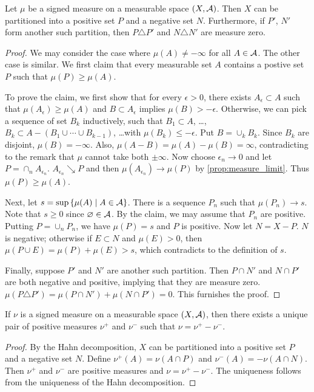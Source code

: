 \begin{theorem}
    Let $\mu$ be a signed measure on a measurable space $(X,\mathcal{A})$. Then 
    $X$ can be partitioned into a positive set $P$ and a negative set $N$. 
    Furthermore, if $P'$, $N'$ form another such partition, then 
    $P\triangle P'$ and $N\triangle N'$ are measure zero.
\end{theorem}
\begin{proof}
    We may consider the case where $\mu(A)\neq -\infty$ for all $A\in\mathcal{A}$. 
    The other case is similar. We first claim that every measurable set 
    $A$ contains a postive set $P$ such that $\mu(P)\geq\mu(A)$. 

    To prove the claim, we first show that for every $\epsilon>0$, 
    there exists $A_\epsilon\subset A$ such that $\mu(A_\epsilon)
    \geq\mu(A)$ and $B\subset A_\epsilon$ implies $\mu(B)>-\epsilon$. 
    Otherwise, we can pick a sequence of set $B_k$ inductively, 
    such that $B_1\subset A$, \ldots, 
    $B_k\subset A-(B_1\cup\cdots\cup B_{k-1})$, \ldots with 
    $\mu(B_k)\leq -\epsilon$. Put $B = \cup_k B_k$. Since $B_k$ 
    are disjoint, $\mu(B) = -\infty$. Also, $\mu(A-B) = \mu(A)-\mu(B) 
    = \infty$, contradicting to the remark that $\mu$ cannot 
    take both $\pm\infty$. Now choose $\epsilon_n\to 0$ and let 
    $P = \cap_n A_{\epsilon_n}$. $A_{\epsilon_n}\searrow P$ and then 
    $\mu(A_{\epsilon_n})\to\mu(P)$ by \cref{prop:measure_limit}. 
    Thus $\mu(P)\geq\mu(A)$.

    Next, let $s = \sup\left\{ \mu(A) \;\middle\vert\; A\in\mathcal{A} \right\}$. There is a sequence 
    $P_n$ such that $\mu(P_n)\to s$. Note that $s\geq 0$ since 
    $\varnothing\in\mathcal{A}$. By the claim, we may assume that $P_n$ are 
    positive. Putting $P = \cup_n P_n$, we have $\mu(P) = s$ 
    and $P$ is positive. Now let $N = X-P$. $N$ is negative; 
    otherwise if $E\subset N$ and $\mu(E)>0$, then $\mu(P\cup E) 
    = \mu(P) + \mu(E) > s$, which contradicts to the definition 
    of $s$. 

    Finally, suppose $P'$ and $N'$ are another such partition. 
    Then $P\cap N'$ and $N\cap P'$ are both negative and positive, 
    implying that they are measure zero. $\mu(P\triangle P') 
    = \mu(P\cap N') + \mu(N\cap P') = 0$. This furnishes the 
    proof.
\end{proof}

\begin{corollary}
    If $\nu$ is a signed measure on a measurable space $(X,\mathcal{A})$, 
    then there exists a unique pair of positive measures $\nu^+$ 
    and $\nu^-$ such that $\nu = \nu^+ - \nu^-$.
\end{corollary}
\begin{proof}
    By the Hahn decomposition, $X$ can be partitioned into a positive 
    set $P$ and a negative set $N$. Define $\nu^+(A) = \nu(A\cap P)$ 
    and $\nu^-(A) = -\nu(A\cap N)$. Then $\nu^+$ and $\nu^-$ are 
    positive measures and $\nu = \nu^+ - \nu^-$. The uniqueness 
    follows from the uniqueness of the Hahn decomposition.
\end{proof}

